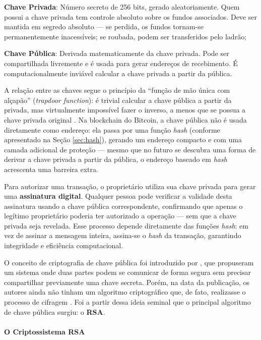 \begin{alineas}
    \item \textbf{Chave Privada}: Número secreto de 256 bits, gerado aleatoriamente. Quem possui a chave privada tem controle absoluto sobre os fundos associados. Deve ser mantida em segredo absoluto --- se perdida, os fundos tornam-se permanentemente inacessíveis; se roubada, podem ser transferidos pelo ladrão;
    \item \textbf{Chave Pública}: Derivada matematicamente da chave privada. Pode ser compartilhada livremente e é usada para gerar endereços de recebimento. É computacionalmente inviável calcular a chave privada a partir da pública.
\end{alineas}

A relação entre as chaves segue o princípio da ``função de mão única com alçapão'' (\textit{trapdoor function}): é trivial calcular a chave pública a partir da privada, mas virtualmente impossível fazer o inverso, a menos que se possua a chave privada original \cite{tomaz2014}. Na blockchain do Bitcoin, a chave pública não é usada diretamente como endereço: ela passa por uma função \textit{hash} (conforme apresentado na Seção \ref{sec:hash}), gerando um endereço compacto e com uma camada adicional de proteção --- mesmo que no futuro se descubra uma forma de derivar a chave privada a partir da pública, o endereço baseado em \textit{hash} acrescenta uma barreira extra.

Para autorizar uma transação, o proprietário utiliza sua chave privada para gerar uma \textbf{assinatura digital}. Qualquer pessoa pode verificar a validade desta assinatura usando a chave pública correspondente, confirmando que apenas o legítimo proprietário poderia ter autorizado a operação --- sem que a chave privada seja revelada. Esse processo depende diretamente das funções \textit{hash}: em vez de assinar a mensagem inteira, assina-se o \textit{hash} da transação, garantindo integridade e eficiência computacional.

O conceito de criptografia de chave pública foi introduzido por , que propuseram um sistema onde duas partes podem se comunicar de forma segura sem precisar compartilhar previamente uma chave secreta. Porém, na data da publicação, os autores ainda não tinham um algoritmo criptográfico que, de fato, realizasse o processo de cifragem \cite{tomaz2014}. Foi a partir dessa ideia seminal que o principal algoritmo de chave pública surgiu: o \textbf{RSA}.

\paragraph{O Criptossistema RSA}

